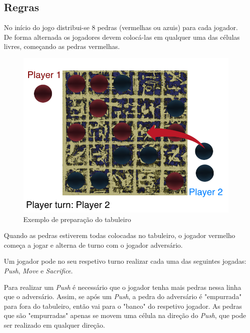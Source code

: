 \documentclass[a4paper]{article}
\begin{document}
\subsection{Regras}

No início do jogo distribui-se 8 pedras (vermelhas ou azuis) para cada jogador. De forma alternada os jogadores devem colocá-las em qualquer uma das células livres, começando as pedras vermelhas.

\begin{figure}[!htb]
\centering
\includegraphics[scale=0.3]{board_prep.png} 
\caption{Exemplo de preparação do tabuleiro}
\end{figure}

Quando as pedras estiverem todas colocadas no tabuleiro, o jogador vermelho começa a jogar e alterna de turno com o jogador adversário.

Um jogador pode no seu respetivo turno realizar cada uma das seguintes jogadas: \textit{Push}, \textit{Move} e \textit{Sacrifice}.

Para realizar um  \textit{Push} é necessário que o jogador tenha mais pedras nessa linha que o adversário. Assim, se após um  \textit{Push}, a pedra do adversário é "empurrada" para fora do tabuleiro, então vai para o "banco" do respetivo jogador. As pedras que são "empurradas" apenas se movem uma célula na direção do \textit{Push}, que pode ser realizado em qualquer direção.
\end{document}
